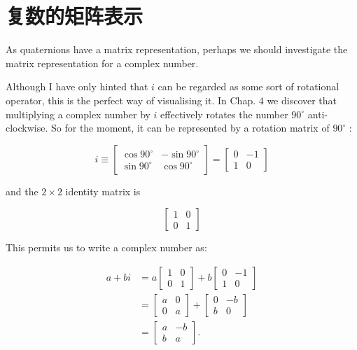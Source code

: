 \section{复数的矩阵表示}
As quaternions have a matrix representation, perhaps we should investigate the matrix representation for a complex number.

Although I have only hinted that $i$ can be regarded as some sort of rotational operator, this is the perfect way of visualising it. In Chap. 4 we discover that multiplying a complex number by $i$ effectively rotates the number $90^{\circ}$ anti-clockwise. So for the moment, it can be represented by a rotation matrix of $90^{\circ}$ :

$$
i \equiv\left[\begin{array}{cc}
\cos 90^{\circ} & -\sin 90^{\circ} \\
\sin 90^{\circ} & \cos 90^{\circ}
\end{array}\right]=\left[\begin{array}{cc}
0 & -1 \\
1 & 0
\end{array}\right]
$$

and the $2 \times 2$ identity matrix is

$$
\left[\begin{array}{ll}
1 & 0 \\
0 & 1
\end{array}\right]
$$

This permits us to write a complex number as:

$$
\begin{aligned}
a+b i & =a\left[\begin{array}{ll}
1 & 0 \\
0 & 1
\end{array}\right]+b\left[\begin{array}{cc}
0 & -1 \\
1 & 0
\end{array}\right] \\
& =\left[\begin{array}{ll}
a & 0 \\
0 & a
\end{array}\right]+\left[\begin{array}{cc}
0 & -b \\
b & 0
\end{array}\right] \\
& =\left[\begin{array}{cc}
a & -b \\
b & a
\end{array}\right] .
\end{aligned}
$$


